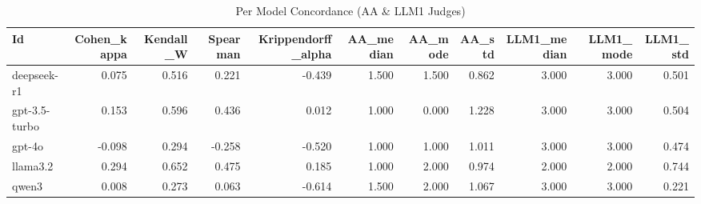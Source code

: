 \begin{table}
\caption{Per Model Concordance (AA & LLM1 Judges)}
\label{tab:per_model_concordance_AA_LLM1}
\begin{tabular}{lrrrrrrrrrr}
\toprule
Id & Cohen_kappa & Kendall_W & Spearman & Krippendorff_alpha & AA_median & AA_mode & AA_std & LLM1_median & LLM1_mode & LLM1_std \\
\midrule
deepseek-r1 & 0.075 & 0.516 & 0.221 & -0.439 & 1.500 & 1.500 & 0.862 & 3.000 & 3.000 & 0.501 \\
gpt-3.5-turbo & 0.153 & 0.596 & 0.436 & 0.012 & 1.000 & 0.000 & 1.228 & 3.000 & 3.000 & 0.504 \\
gpt-4o & -0.098 & 0.294 & -0.258 & -0.520 & 1.000 & 1.000 & 1.011 & 3.000 & 3.000 & 0.474 \\
llama3.2 & 0.294 & 0.652 & 0.475 & 0.185 & 1.000 & 2.000 & 0.974 & 2.000 & 2.000 & 0.744 \\
qwen3 & 0.008 & 0.273 & 0.063 & -0.614 & 1.500 & 2.000 & 1.067 & 3.000 & 3.000 & 0.221 \\
\bottomrule
\end{tabular}
\end{table}
